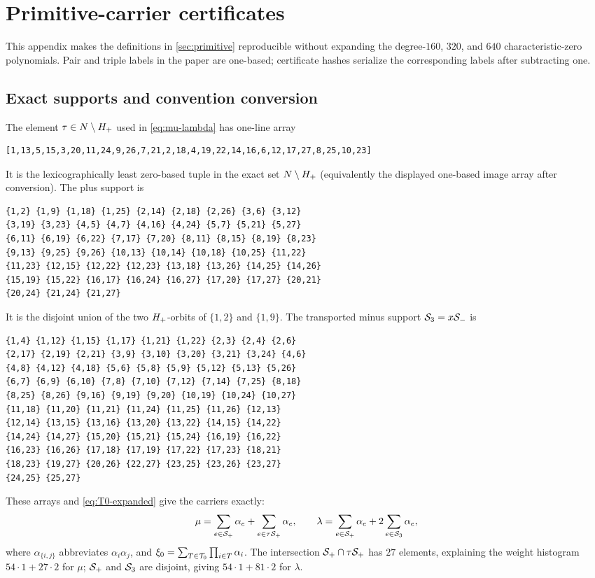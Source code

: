 \section{Primitive-carrier certificates}
\label{app:carriers}

This appendix makes the definitions in \cref{sec:primitive} reproducible
without expanding the degree-$160$, $320$, and $640$ characteristic-zero
polynomials.  Pair and triple labels in the paper are one-based; certificate
hashes serialize the corresponding labels after subtracting one.

\subsection{Exact supports and convention conversion}
\label{app:carrier-supports}

The element $\tau\in N\setminus H_{+}$ used in \eqref{eq:mu-lambda} has
one-line array
\begingroup\small
\begin{verbatim}
[1,13,5,15,3,20,11,24,9,26,7,21,2,18,4,19,22,14,16,6,12,17,27,8,25,10,23]
\end{verbatim}
\endgroup
It is the lexicographically least zero-based tuple in the exact set
$N\setminus H_{+}$ (equivalently the displayed one-based image array after
conversion).  The plus support is
\begingroup\scriptsize
\begin{verbatim}
{1,2} {1,9} {1,18} {1,25} {2,14} {2,18} {2,26} {3,6} {3,12}
{3,19} {3,23} {4,5} {4,7} {4,16} {4,24} {5,7} {5,21} {5,27}
{6,11} {6,19} {6,22} {7,17} {7,20} {8,11} {8,15} {8,19} {8,23}
{9,13} {9,25} {9,26} {10,13} {10,14} {10,18} {10,25} {11,22}
{11,23} {12,15} {12,22} {12,23} {13,18} {13,26} {14,25} {14,26}
{15,19} {15,22} {16,17} {16,24} {16,27} {17,20} {17,27} {20,21}
{20,24} {21,24} {21,27}
\end{verbatim}
\endgroup
It is the disjoint union of the two $H_{+}$-orbits of $\{1,2\}$ and
$\{1,9\}$.  The transported minus support $\mathcal{S}_3=x\mathcal{S}_-$ is
\begingroup\scriptsize
\begin{verbatim}
{1,4} {1,12} {1,15} {1,17} {1,21} {1,22} {2,3} {2,4} {2,6}
{2,17} {2,19} {2,21} {3,9} {3,10} {3,20} {3,21} {3,24} {4,6}
{4,8} {4,12} {4,18} {5,6} {5,8} {5,9} {5,12} {5,13} {5,26}
{6,7} {6,9} {6,10} {7,8} {7,10} {7,12} {7,14} {7,25} {8,18}
{8,25} {8,26} {9,16} {9,19} {9,20} {10,19} {10,24} {10,27}
{11,18} {11,20} {11,21} {11,24} {11,25} {11,26} {12,13}
{12,14} {13,15} {13,16} {13,20} {13,22} {14,15} {14,22}
{14,24} {14,27} {15,20} {15,21} {15,24} {16,19} {16,22}
{16,23} {16,26} {17,18} {17,19} {17,22} {17,23} {18,21}
{18,23} {19,27} {20,26} {22,27} {23,25} {23,26} {23,27}
{24,25} {25,27}
\end{verbatim}
\endgroup
These arrays and \eqref{eq:T0-expanded} give the carriers exactly:
\[
 \mu=\sum_{e\in\mathcal{S}_+}\alpha_e+\sum_{e\in\tau\mathcal{S}_+}\alpha_e,
 \qquad
 \lambda=\sum_{e\in\mathcal{S}_+}\alpha_e+2\sum_{e\in\mathcal{S}_3}\alpha_e,
\]
where $\alpha_{\{i,j\}}$ abbreviates $\alpha_i\alpha_j$, and
$\xi_0=\sum_{T\in\mathcal{T}_0}\prod_{i\in T}\alpha_i$.  The intersection
$\mathcal{S}_+\cap\tau\mathcal{S}_+$ has $27$ elements, explaining the weight histogram
$54\cdot1+27\cdot2$ for $\mu$; $\mathcal{S}_+$ and $\mathcal{S}_3$ are disjoint, giving
$54\cdot1+81\cdot2$ for $\lambda$.

